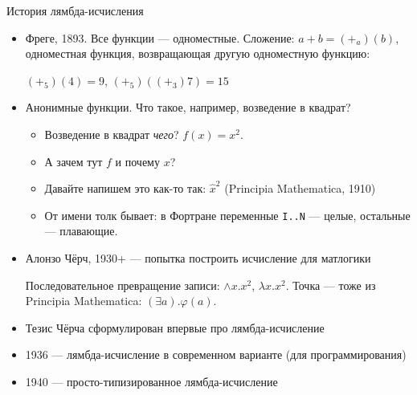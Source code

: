 \documentclass[aspectratio=169]{beamer}
\begin{document}
\newcommand\doubleplus{+\kern-1.3ex+\kern0.8ex}
\newcommand\mdoubleplus{\ensuremath{\mathbin{+\mkern-10mu+}}}

\begin{frame}[fragile]{История лямбда-исчисления}
\begin{itemize}
\item Фреге, 1893. Все функции --- одноместные. Сложение: $a+b = (+_a)(b)$, одноместная
функция, возвращающая другую одноместную функцию:

$(+_5)(4) = 9$, $(+_5)((+_3) 7) = 15$

\item Анонимные функции. Что такое, например, возведение в квадрат? 
\begin{itemize}
\item Возведение в квадрат \emph{чего}? $f(x) =x^2$. 
\item А зачем тут $f$ и почему $x$?
\item Давайте напишем это как-то так: $\hat{x}^2$ (Principia Mathematica, 1910)
\item От имени толк бывает: в Фортране переменные \verb!I..N! --- целые, остальные --- плавающие.
\end{itemize}
\item Алонзо Чёрч, 1930+ --- попытка построить исчисление для матлогики

Последовательное превращение записи: $\wedge x.x^2$, $\lambda x.x^2$. 
Точка --- тоже из Principia Mathematica: $(\exists a).\varphi(a)$.

\item Тезис Чёрча сформулирован впервые про лямбда-исчисление
\item 1936 --- лямбда-исчисление в современном варианте (для программирования)
\item 1940 --- просто-типизированное лямбда-исчисление 
\end{itemize}
\end{frame}
\end{document}
